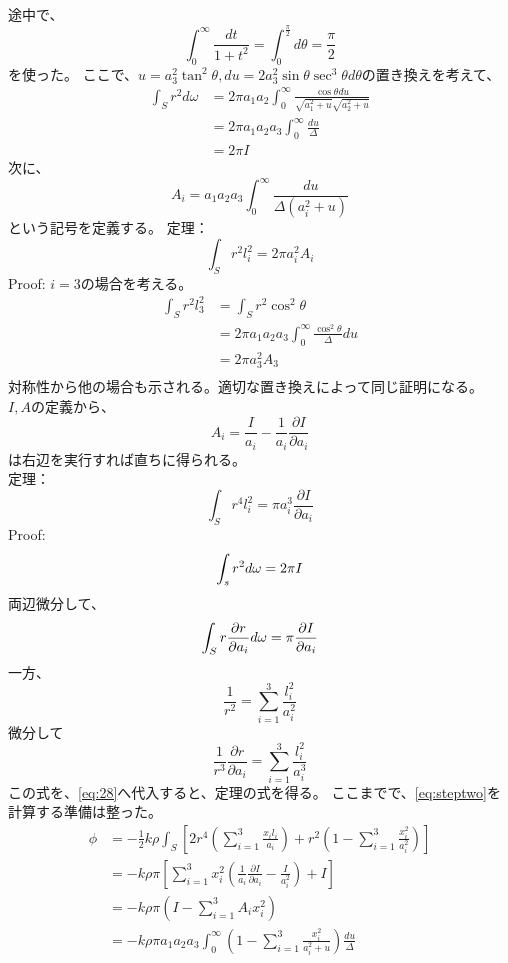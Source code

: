 \documentclass{jsarticle}
\newcommand{\pder}[2][]{\frac{\partial#1}{\partial#2}}
\newcommand{\beq}{\begin{equation}}
\newcommand{\eeq}{\end{equation}}
\newcommand{\xid}{x_i^2}
\newcommand{\lid}{l_i^2}
\newcommand{\aid}{a_i^2}
\newcommand{\sumit}{\sum_{i=1}^3}
\newcommand{\cosdt}{\cos^2\theta}
\newcommand{\tandt}{\tan^2\theta}
\begin{document}
途中で、
\beq
\int_0^{\infty} \frac{dt}{1+t^2} = \int_0^{\frac{\pi}{2}} d\theta= \frac{\pi}{2}
\eeq
を使った。
ここで、$u = a_3^2 \tandt, du = 2a_3^2 \sin\theta \sec^3\theta d\theta$の置き換えを考えて、
\begin{align}
    \int_S r^2 d\omega &= 2\pi a_1 a_2 \int_0^\infty \frac{\cos\theta du}{\sqrt{a_1^2 + u}\sqrt{a_2^2 + u}}\\
                       &= 2 \pi a_1 a_2 a_3 \int_0^\infty \frac{du}{\Delta}\\
                       &= 2\pi I
\end{align}
次に、
\beq
A_i = a_1 a_2 a_3 \int_0^{\infty} \frac{du}{\Delta (a_i^2 + u)}
\eeq
という記号を定義する。
定理：
\beq
\int_S r^2 l_i^2 = 2\pi a_i^2 A_i
\eeq
Proof:
$i=3$の場合を考える。
\begin{align}
    \int_S r^2 l_3^2 &= \int_S r^2 \cosdt\\
                     &= 2 \pi a_1 a_2 a_3 \int_0^\infty \frac{\cosdt}{\Delta}du\\
                     &= 2\pi a_3^2 A_3\\
\end{align}
対称性から他の場合も示される。適切な置き換えによって同じ証明になる。\\
$I,A$の定義から、
\beq
A_i = \frac{I}{a_i} - \frac{1}{a_i}\pder[I]{a_i}
\eeq
は右辺を実行すれば直ちに得られる。\\
定理：
\beq
\int_S r^4 l_i^2 = \pi a_i^3 \pder[I]{a_i}
\eeq
Proof:
\beq
    \int_s r^2 d\omega = 2\pi I\\
\eeq
両辺微分して、
\beq
\int_S r\pder[r]{a_i} d\omega = \pi \pder[I]{a_i}\label{eq:28}\\
\eeq
一方、
\beq
\frac{1}{r^2} = \sumit \frac{\lid}{\aid}
\eeq
微分して
\beq
\frac{1}{r^3}\pder[r]{a_i} = \sumit \frac{\lid}{a_i^3}
\eeq
この式を、\eqref{eq:28}へ代入すると、定理の式を得る。
ここまでで、\eqref{eq:steptwo}を計算する準備は整った。
\begin{align}
    \phi &= -\frac{1}{2} k \rho \int_S \left[2r^4 \left(\sumit \frac{x_i l_i}{a_i} \right) + r^2 \left(1 -  \sumit \frac{\xid}{\aid}\right)\right]\\
         &= -k \rho \pi \left[\sumit \xid \left( \frac{1}{a_i}\pder[I]{a_i} - \frac{I}{\aid} \right) + I \right]\\
         &= -k \rho \pi \left(
             I - \sumit A_i \xid
         \right)\\
         &= -k \rho \pi a_1 a_2 a_3 \int_0^\infty \left(1 - \sumit \frac{\xid}{\aid + u}\right) \frac{du}{\Delta}
\end{align}
\end{document}
